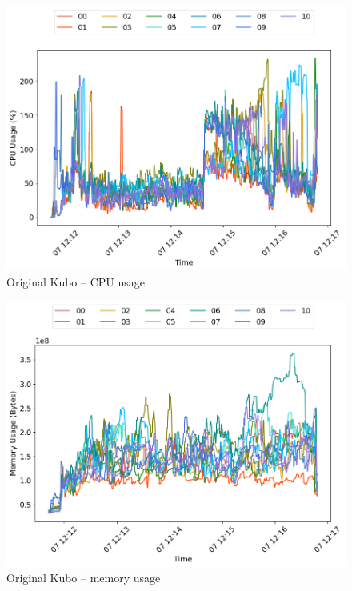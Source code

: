 \begin{minipage}{0.5\linewidth}
\begin{figure}[H]
\captionsetup{justification=centering,width=0.8\linewidth}
\includegraphics[width=\linewidth]{figures/original/cpu_usage.png}
\caption{Original Kubo -- CPU usage}
\label{fig:original-cpu_usage}
\end{figure}
\end{minipage}
\begin{minipage}{0.5\linewidth}
\begin{figure}[H]
\captionsetup{justification=centering,width=0.8\linewidth}
\includegraphics[width=\linewidth]{figures/original/mem_usage.png}
\caption{Original Kubo -- memory usage}
\label{fig:original-mem_usage}
\end{figure}
\end{minipage}


